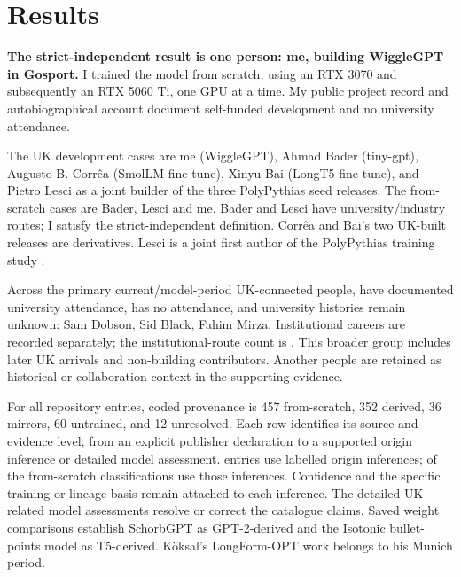 \section{Results}
\textbf{The strict-independent result is one person: me, building WiggleGPT
in Gosport.} I trained the model from scratch, using an RTX 3070 and
subsequently an RTX 5060 Ti, one GPU at a time. My public project record and
autobiographical account document self-funded development and no university attendance.



The UK development cases are me (WiggleGPT), Ahmad Bader (tiny-gpt), Augusto
B. Corr\^ea (SmolLM fine-tune), Xinyu Bai (LongT5 fine-tune), and Pietro Lesci
as a joint builder of the three PolyPythias seed releases. The
from-scratch cases are Bader, Lesci and me. Bader and Lesci have
university/industry routes; I satisfy the strict-independent
definition. Corr\^ea and Bai's two UK-built releases are derivatives.
Lesci is a joint first author of the PolyPythias training study
\cite{polypythias}.

Across the \PrimaryPeople{} primary current/model-period UK-connected people, \PrimaryUniversityYes{} have
documented university attendance, \PrimaryUniversityNo{} has no attendance, and \PrimaryUniversityUnknown{} university
histories remain unknown: Sam Dobson, Sid Black, Fahim Mirza. Institutional careers are
recorded separately; the institutional-route count is
\PrimaryInstitutional{}. This broader group includes later UK arrivals and
non-building contributors. Another \HistoricalContextPeople{} people are retained as historical
or collaboration context in the supporting evidence.

For all \CensusModels{} repository entries, coded provenance is 457 from-scratch,
352 derived, 36 mirrors, 60 untrained, and 12
unresolved. Each row identifies its source and evidence level, from an
explicit publisher declaration to a supported origin inference or detailed
model assessment. \InferredProvenanceModels{} entries use labelled
origin inferences; \InferredScratchModels{} of
the from-scratch classifications use those inferences. Confidence and the
specific training or lineage basis remain attached to each inference. The \DetailedModelAssessments{}
detailed UK-related model assessments resolve or correct the catalogue
claims. Saved weight comparisons establish SchorbGPT as GPT-2-derived
and the Isotonic bullet-points model as T5-derived. K\"oksal's LongForm-OPT
work belongs to his Munich period.

